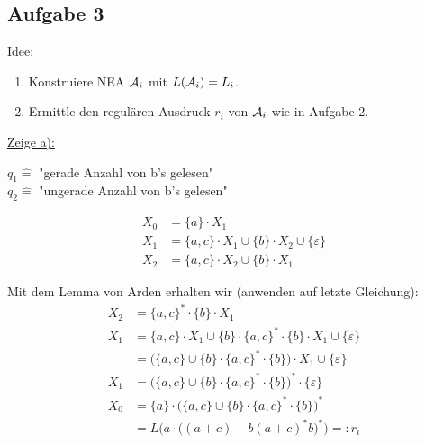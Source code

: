 \subsection{Aufgabe 3}

\begin{lösung}
	Idee: 
	\begin{enumerate}
		\item Konstruiere NEA $\mathcal{A}_i$ mit $L(\mathcal{A}_i)=L_i$.
		\item Ermittle den regulären Ausdruck $r_i$ von $\mathcal{A}_i$ wie in Aufgabe 2.
	\end{enumerate}		

	\underline{Zeige a):}
	
	\usetikzlibrary{positioning,automata}

	$q_1\hat{=}$ "gerade Anzahl von b's gelesen"\\
	$q_2\hat{=}$ "ungerade Anzahl von b's gelesen"
	
	\begin{align}
		X_0&=\lbrace a\rbrace\cdot X_1\\
		X_1&=\lbrace a,c\rbrace\cdot X_1\cup\lbrace b\rbrace\cdot X_2\cup\lbrace\varepsilon\rbrace\\
		X_2&=\lbrace a,c\rbrace\cdot X_2\cup\lbrace b\rbrace\cdot X_1
	\end{align}
	
	Mit dem Lemma von Arden erhalten wir (anwenden auf letzte Gleichung):
	\begin{align*}
		X_2&=\lbrace a,c\rbrace^\ast\cdot\lbrace b\rbrace\cdot X_1\\
		X_1&=\lbrace a,c\rbrace\cdot X_1\cup\lbrace b\rbrace\cdot\lbrace a,c\rbrace^\ast\cdot\lbrace b\rbrace\cdot X_1\cup\lbrace\varepsilon\rbrace\\
		&=\Big(\lbrace a,c\rbrace\cup\lbrace b\rbrace\cdot\lbrace a,c\rbrace^\ast\cdot\lbrace b\rbrace\Big)\cdot X_1 \cup\lbrace\varepsilon\rbrace\\
		X_1&=\Big(\lbrace a,c\rbrace\cup\lbrace b\rbrace\cdot\lbrace a,c\rbrace^\ast\cdot\lbrace b\rbrace\Big)^\ast\cdot\lbrace\varepsilon\rbrace\\
		X_0&=\lbrace a\rbrace\cdot\Big(\lbrace a,c\rbrace\cup\lbrace b\rbrace\cdot\lbrace a,c\rbrace^\ast\cdot\lbrace b\rbrace\Big)^\ast\\
		&=L\Big(a\cdot\big((a+c)+b(a+c)^\ast b\big)^\ast\Big)=:r_i
	\end{align*}		
	

\end{lösung}
